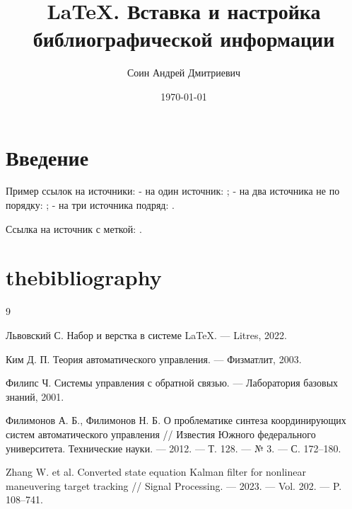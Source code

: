 \documentclass[a4paper,12pt]{article}
\author{Соин Андрей Дмитриевич}
\title{\LaTeX. Вставка и настройка библиографической информации}
\date{\today}
\begin{document}
\maketitle

\tableofcontents

\section{Введение}
Пример ссылок на источники:
- на один источник: \cite{lvovsky};
- на два источника не по порядку: \cite{kim,filimonov2012};
- на три источника подряд: \cite{kim,philips,filimonov2012}.

Ссылка на источник с меткой: \cite{lvovsky}.

\section*{thebibliography}


\renewcommand{\refname}{Список использованных источников}

\makeatletter
\renewcommand{\@biblabel}[1]{#1.}
\makeatother

\begin{thebibliography}{9}

   Львовский С. Набор и верстка в системе \LaTeX. — Litres, 2022.

   Ким Д. П. Теория автоматического управления. — Физматлит, 2003.

   Филипс Ч. Системы управления с обратной связью. — Лаборатория базовых знаний, 2001.

   Филимонов А. Б., Филимонов Н. Б. О проблематике синтеза координирующих систем автоматического управления // Известия Южного федерального университета. Технические науки. — 2012. — Т. 128. — № 3. — С. 172–180.

   Zhang W. et al. Converted state equation Kalman filter for nonlinear maneuvering target tracking // Signal Processing. — 2023. — Vol. 202. — P. 108–741.

\end{thebibliography}
\end{document}
